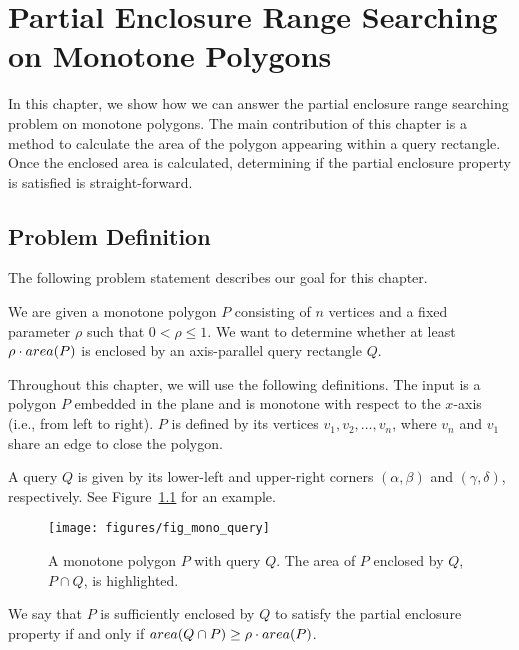 \chapter{Partial Enclosure Range Searching on Monotone Polygons}
\label{:monotonep}


In this chapter, we show how we can answer the partial enclosure range searching problem on monotone polygons. 
The main contribution of this chapter is a method to calculate the area of the polygon appearing within a query rectangle. 
Once the enclosed area is calculated, determining if the partial enclosure property is satisfied is straight-forward.


\section{Problem Definition}
\label{:monotonep:problem-definition}

The following problem statement describes our goal for this chapter.

\begin{problem}
We are given a monotone polygon $P$ consisting of $n$ vertices and a fixed parameter $\rho$ such that $0 < \rho \leq 1$. We want to determine whether at least $\rho \cdot area(P)$ is enclosed by an axis-parallel query rectangle $Q$.
\end{problem}

Throughout this chapter, we will use the following definitions. The input is a polygon $P$ embedded in the plane and is monotone with respect to the $x$-axis (i.e., from left to right). $P$ is defined by its vertices $v_1, v_2, \ldots, v_n$, where $v_n$ and $v_1$ share an edge to close the polygon. 

A query $Q$ is given by its lower-left and upper-right corners $(\alpha, \beta)$ and $(\gamma, \delta)$, respectively. See Figure~\ref{fig:monotonep:query-example} for an example.

\begin{figure}[t]
\begin{center}
  \texttt{[image: figures/fig\_mono\_query]}
  \caption[A monotone polygon $P$ with query $Q$.]{A monotone polygon $P$ with query $Q$. The area of $P$ enclosed by $Q$, $P \cap Q$, is highlighted.}
  \label{fig:monotonep:query-example}
\end{center}
\end{figure}

We say that $P$ is sufficiently enclosed by $Q$ to satisfy the partial enclosure property if and only if $area(Q \cap P) \geq \rho \cdot area(P)$.


